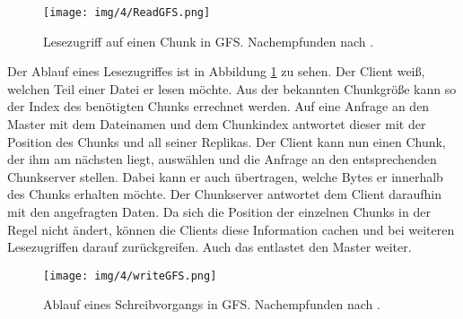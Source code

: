 \documentclass[12pt,oneside,a4paper,parskip]{scrbook}
\begin{document}
\begin{figure}[htb]
  \centering
  \texttt{[image: img/4/ReadGFS.png]}
  \caption[Lesezugriff auf einen Chunk in GFS]{Lesezugriff auf einen Chunk in GFS. Nachempfunden nach \cite{GFS}.}
  \label{readgfs}
\end{figure}

Der Ablauf eines Lesezugriffes ist in Abbildung \ref{readgfs} zu sehen. Der Client weiß, welchen Teil einer Datei er lesen möchte. Aus der bekannten Chunkgröße kann so der Index des benötigten Chunks errechnet werden. Auf eine Anfrage an den Master mit dem Dateinamen und dem Chunkindex antwortet dieser mit der Position des Chunks und all seiner Replikas. Der Client kann nun einen Chunk, der ihm am nächsten liegt, auswählen und die Anfrage an den entsprechenden Chunkserver stellen. Dabei kann er auch übertragen, welche Bytes er innerhalb des Chunks erhalten möchte. Der Chunkserver antwortet dem Client daraufhin mit den angefragten Daten. Da sich die Position der einzelnen Chunks in der Regel nicht ändert, können die Clients diese Information cachen und bei weiteren Lesezugriffen darauf zurückgreifen. Auch das entlastet den Master weiter.

\begin{figure}[htb]
  \centering
  \texttt{[image: img/4/writeGFS.png]}
  \caption[Schreiben eines Chunks in GFS]{Ablauf eines Schreibvorgangs in GFS. Nachempfunden nach \cite{GFS}.}
  \label{writeGFS}
\end{figure}
\end{document}
